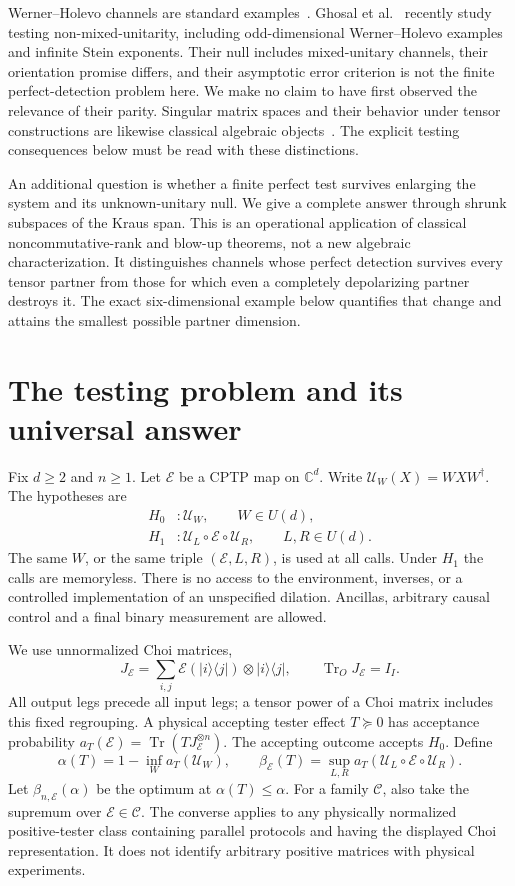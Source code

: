\documentclass[11pt,a4paper]{article}
\theoremstyle{remark}\newtheorem{remark}[theorem]{Remark}
\DeclareMathOperator{\Tr}{Tr}
\newcommand{\E}{\mathcal E}
\newcommand{\U}{\mathcal U}
\newcommand{\C}{\mathcal C}
\newcommand{\CC}{\mathbb C}
\newcommand{\ket}[1]{\lvert #1\rangle}
\newcommand{\bra}[1]{\langle #1\rvert}
\begin{document}
Werner--Holevo channels are standard examples~\cite{werner}. Ghosal et al.~\cite{ghosal} recently study testing non-mixed-unitarity, including odd-dimensional Werner--Holevo examples and infinite Stein exponents. Their null includes mixed-unitary channels, their orientation promise differs, and their asymptotic error criterion is not the finite perfect-detection problem here. We make no claim to have first observed the relevance of their parity. Singular matrix spaces and their behavior under tensor constructions are likewise classical algebraic objects~\cite{ggow,derksen}. The explicit testing consequences below must be read with these distinctions.


An additional question is whether a finite perfect test survives enlarging the system and its unknown-unitary null. We give a complete answer through shrunk subspaces of the Kraus span. This is an operational application of classical noncommutative-rank and blow-up theorems, not a new algebraic characterization. It distinguishes channels whose perfect detection survives every tensor partner from those for which even a completely depolarizing partner destroys it. The exact six-dimensional example below quantifies that change and attains the smallest possible partner dimension.

\section{The testing problem and its universal answer}
Fix $d\ge2$ and $n\ge1$. Let $\E$ be a CPTP map on $\CC^d$. Write $\U_W(X)=WXW^\dagger$. The hypotheses are
\begin{align}
H_0 &: \U_W,\qquad W\in U(d),\\
H_1 &: \U_L\circ\E\circ\U_R,\qquad L,R\in U(d).
\end{align}
The same $W$, or the same triple $(\E,L,R)$, is used at all calls. Under $H_1$ the calls are memoryless. There is no access to the environment, inverses, or a controlled implementation of an unspecified dilation. Ancillas, arbitrary causal control and a final binary measurement are allowed.

We use unnormalized Choi matrices,
\[
J_\E=\sum_{i,j}\E(\ket i\bra j)\otimes\ket i\bra j,
\qquad \Tr_OJ_\E=I_I.
\]
All output legs precede all input legs; a tensor power of a Choi matrix includes this fixed regrouping. A physical accepting tester effect $T\succeq0$ has acceptance probability $a_T(\E)=\Tr(TJ_\E^{\otimes n})$. The accepting outcome accepts $H_0$. Define
\[
\alpha(T)=1-\inf_W a_T(\U_W),\qquad
\beta_\E(T)=\sup_{L,R}a_T(\U_L\circ\E\circ\U_R).
\]
Let $\beta_{n,\E}(\alpha)$ be the optimum at $\alpha(T)\le\alpha$. For a family $\C$, also take the supremum over $\E\in\C$. The converse applies to any physically normalized positive-tester class containing parallel protocols and having the displayed Choi representation. It does not identify arbitrary positive matrices with physical experiments.
\end{document}
